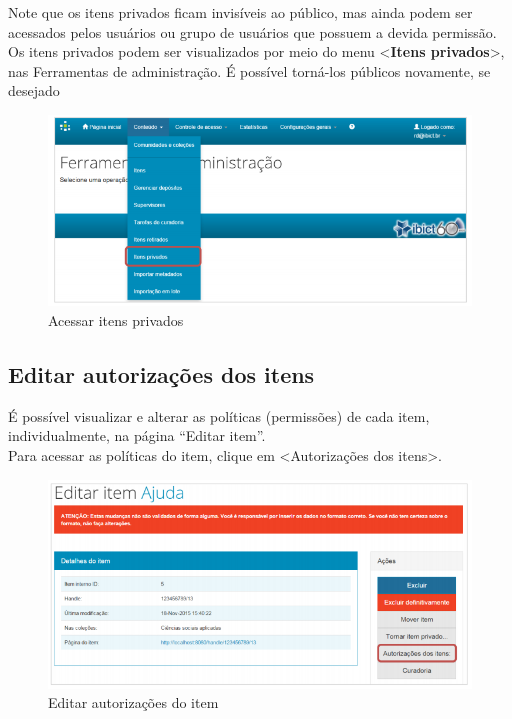 \documentclass[12pt,hidelinks]{article}
\begin{document}
\newpage

    Note que os itens privados ficam invisíveis ao público, mas ainda podem ser acessados pelos usuários ou grupo de usuários que possuem a devida permissão. Os itens privados podem ser visualizados por meio do menu <\textbf{Itens privados}>, nas Ferramentas de administração. É possível torná-los públicos novamente, se desejado
    
    \begin{figure}[!htp]
                \centering
                \includegraphics[scale=0.7]{figura/Figura108.png}
                \caption{Acessar itens privados}
            \label{Rotulo}
        \end{figure}
    
    \subsection{Editar autorizações dos itens}
    
    É possível visualizar e alterar as políticas (permissões) de cada item, individualmente, na página “Editar item”. \\
    
    Para acessar as políticas do item, clique em <Autorizações dos itens>.
    
    \begin{figure}[!htp]
                \centering
                \includegraphics[scale=0.7]{figura/Figura109.png}
                \caption{Editar autorizações do item}
            \label{Rotulo}
        \end{figure}
\end{document}
